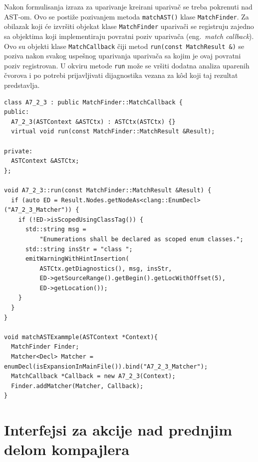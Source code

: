 \documentclass[12pt,oneside]{memoir}
\begin{document}
\par
Nakon formulisanja izraza za uparivanje kreirani upariva\v{c} se treba pokrenuti nad AST-om. Ovo se posti\v{z}e pozivanjem metoda \lstinline[style=customc]{matchAST()} klase \texttt{MatchFinder}. 
Za obilazak koji \'{c}e izvr\v{s}iti objekat klase \texttt{MatchFinder} upariva\v{c}i se registruju zajedno sa objektima koji implementiraju povratni poziv upariva\v{c}a (eng.~\textit{match callback}). 
Ovo su objekti klase \texttt{MatchCallback} \v{c}iji metod \lstinline[style=customc]{run(const MatchResult &)} se poziva nakon svakog uspe\v{s}nog uparivanja 
upariva\v{c}a sa kojim je ovaj povratni poziv registrovan. U okviru metode \texttt{run} mo\v{z}e se vr\v{s}iti dodatna analiza uparenih \v{c}vorova i po potrebi
prijavljivati dijagnostika vezana za k\^{o}d koji taj rezultat predstavlja.

\begin{lstlisting}[style=customc, basicstyle=\tiny, caption={Primer upariva\v{c}a koji pronalazi sve deklaracije \texttt{enum class} enumeratora, odnosno enumeratora koji su deklarisani koriste\'{c}i specifikator \texttt{class}. Ovaj primer demonstrira i upotrebu klasa \texttt{MatchFinder}, \texttt{MatchCallback} i \texttt{MatchResult}.}, label=lst:label7]
class A7_2_3 : public MatchFinder::MatchCallback {
public:
  A7_2_3(ASTContext &ASTCtx) : ASTCtx(ASTCtx) {}
  virtual void run(const MatchFinder::MatchResult &Result);

private:
  ASTContext &ASTCtx;
};

void A7_2_3::run(const MatchFinder::MatchResult &Result) {
  if (auto ED = Result.Nodes.getNodeAs<clang::EnumDecl>("A7_2_3_Matcher")) {
    if (!ED->isScopedUsingClassTag()) {
      std::string msg =
          "Enumerations shall be declared as scoped enum classes.";
      std::string insStr = "class ";
      emitWarningWithHintInsertion(
          ASTCtx.getDiagnostics(), msg, insStr,
          ED->getSourceRange().getBegin().getLocWithOffset(5),
          ED->getLocation());
    }
  }
}

void matchASTExammple(ASTContext *Context){
  MatchFinder Finder;
  Matcher<Decl> Matcher = enumDecl(isExpansionInMainFile()).bind("A7_2_3_Matcher");
  MatchCallback *Callback = new A7_2_3(Context);
  Finder.addMatcher(Matcher, Callback);
}
\end{lstlisting}


\section{Interfejsi za akcije nad prednjim delom kompajlera}
\end{document}
